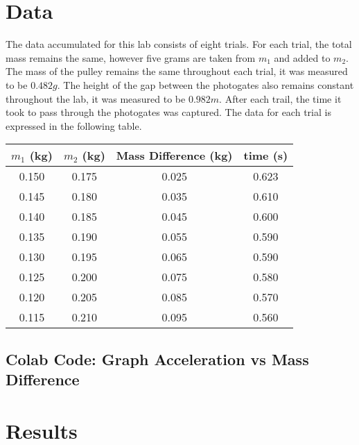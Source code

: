 \documentclass{report}
\begin{document}
    \bigbreak \noindent 
    \section{Data}
    \bigbreak \noindent 
    The data accumulated for this lab consists of eight trials. For each trial, the total mass remains the same, however five grams are taken from $m_{1}$ and added to $m_{2}$. The mass of the pulley remains the same throughout each trial, it was measured to be $0.482g$. The height of the gap between the photogates also remains constant throughout the lab, it was measured to be $0.982m$. After each trail, the time it took to pass through the photogates was captured. The data for each trial is expressed in the following table.
    \bigbreak \noindent 
    \begin{center}
        \begin{tabular}{c|c|c|c}
            $m_{1}$ (kg) & $m_{2}$ (kg) & Mass Difference (kg) & time (s) \\
        \hline
            0.150 & 0.175& 0.025 & 0.623 \\
            0.145 & 0.180& 0.035 & 0.610 \\
            0.140 & 0.185& 0.045 & 0.600 \\
            0.135 & 0.190& 0.055& 0.590 \\
            0.130 & 0.195& 0.065& 0.590 \\
            0.125 &  0.200& 0.075& 0.580 \\
            0.120 &  0.205& 0.085& 0.570 \\
            0.115 &  0.210& 0.095& 0.560 \\
        \end{tabular}
    \end{center}

    \pagebreak 
    \subsection{Colab Code: Graph Acceleration vs Mass Difference}
    \bigbreak \noindent 

    \bigbreak \noindent 
    \section{Results}
    \bigbreak \noindent 
\end{document}
